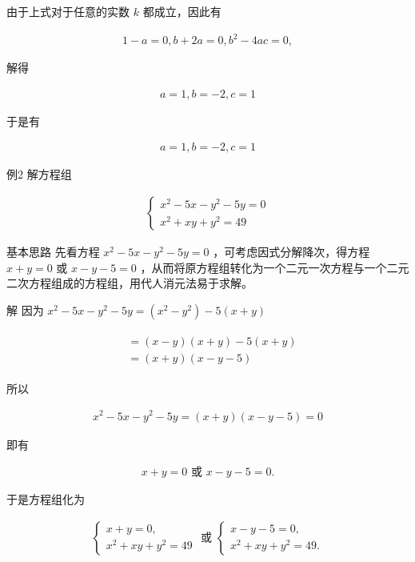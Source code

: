 \documentclass[10pt]{article}
\begin{document}
由于上式对于任意的实数 $k$ 都成立，因此有

\begin{align*}
1-a=0, b+2 a=0, b^{2}-4 a c=0,
\end{align*}

解得

\begin{align*}
a=1, b=-2, c=1
\end{align*}

于是有

\begin{align*}
a=1, b=-2, c=1
\end{align*}

例2 解方程组

\begin{align*}
\left\{\begin{array}{l}
x^{2}-5 x-y^{2}-5 y=0 \\
x^{2}+x y+y^{2}=49
\end{array}\right.
\end{align*}

基本思路 先看方程 $x^{2}-5 x-y^{2}-5 y=0$ ，可考虑因式分解降次，得方程 $x+y=0$ 或 $x-y-5=0$ ，从而将原方程组转化为一个二元一次方程与一个二元二次方程组成的方程组，用代人消元法易于求解。

解 因为 $x^{2}-5 x-y^{2}-5 y=\left(x^{2}-y^{2}\right)-5(x+y)$

\begin{align*}
\begin{aligned}
& =(x-y)(x+y)-5(x+y) \\
& =(x+y)(x-y-5)
\end{aligned}
\end{align*}

所以

\begin{align*}
x^{2}-5 x-y^{2}-5 y=(x+y)(x-y-5)=0
\end{align*}

即有

\begin{align*}
x+y=0 \text { 或 } x-y-5=0 .
\end{align*}

于是方程组化为

\begin{align*}
\left\{\begin{array} { l } 
{ x + y = 0 , } \\
{ x ^ { 2 } + x y + y ^ { 2 } = 4 9 }
\end{array} \text { 或 } \left\{\begin{array}{l}
x-y-5=0, \\
x^{2}+x y+y^{2}=49 .
\end{array}\right.\right.
\end{align*}
\end{document}
